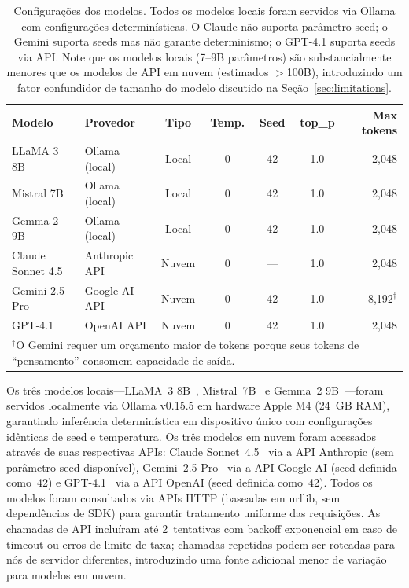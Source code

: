 \documentclass[12pt, a4paper]{article}
\begin{document}
\begin{table}[H]
\centering
\caption{Configurações dos modelos. Todos os modelos locais foram servidos via Ollama com configurações determinísticas. O Claude não suporta parâmetro seed; o Gemini suporta seeds mas não garante determinismo; o GPT-4.1 suporta seeds via API. Note que os modelos locais (7--9B parâmetros) são substancialmente menores que os modelos de API em nuvem (estimados $>$100B), introduzindo um fator confundidor de tamanho do modelo discutido na Seção~\ref{sec:limitations}.}
\label{tab:models}
\begin{tabular}{llccccr}
\toprule
\textbf{Modelo} & \textbf{Provedor} & \textbf{Tipo} & \textbf{Temp.} & \textbf{Seed} & \textbf{top\_p} & \textbf{Max tokens} \\
\midrule
LLaMA 3 8B         & Ollama (local)  & Local  & 0 & 42  & 1.0 & 2{,}048 \\
Mistral 7B          & Ollama (local)  & Local  & 0 & 42  & 1.0 & 2{,}048 \\
Gemma 2 9B          & Ollama (local)  & Local  & 0 & 42  & 1.0 & 2{,}048 \\
\midrule
Claude Sonnet 4.5   & Anthropic API   & Nuvem  & 0 & --- & 1.0 & 2{,}048 \\
Gemini 2.5 Pro      & Google AI API   & Nuvem  & 0 & 42  & 1.0 & 8{,}192$^{\dagger}$ \\
GPT-4.1             & OpenAI API      & Nuvem  & 0 & 42  & 1.0 & 2{,}048 \\
\bottomrule
\multicolumn{7}{l}{\footnotesize $^{\dagger}$O Gemini requer um orçamento maior de tokens porque seus tokens de ``pensamento'' consomem capacidade de saída.}
\end{tabular}
\end{table}

\noindent Os três modelos locais---LLaMA~3 8B~\citep{dubey2024llama3}, Mistral~7B~\citep{jiang2023mistral} e Gemma~2 9B~\citep{team2024gemma}---foram servidos localmente via Ollama v0.15.5 em hardware Apple M4 (24~GB RAM), garantindo inferência determinística em dispositivo único com configurações idênticas de seed e temperatura.
Os três modelos em nuvem foram acessados através de suas respectivas APIs: Claude Sonnet~4.5~\citep{anthropic2024claude} via a API Anthropic (sem parâmetro seed disponível), Gemini~2.5 Pro~\citep{geminiteam2024gemini} via a API Google AI (seed definida como~42) e GPT-4.1~\citep{openai2023gpt4} via a API OpenAI (seed definida como~42).
Todos os modelos foram consultados via APIs HTTP (baseadas em urllib, sem dependências de SDK) para garantir tratamento uniforme das requisições.
As chamadas de API incluíram até 2~tentativas com backoff exponencial em caso de timeout ou erros de limite de taxa; chamadas repetidas podem ser roteadas para nós de servidor diferentes, introduzindo uma fonte adicional menor de variação para modelos em nuvem.
\end{document}
